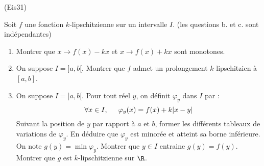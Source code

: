 \begin{tiny}(Eis31)\end{tiny} Soit $f$ une fonction $k$-lipschitzienne sur un intervalle $I$. (les questions b. et c. sont indépendantes)
\begin{enumerate}
 \item Montrer que $x\rightarrow f(x)-kx$ et $x\rightarrow f(x)+kx$ sont monotones.
 \item On suppose  $I=]a,b[$. Montrer que $f$ admet un prolongement $k$-lipschitzien à $[a,b]$.
 \item On suppose  $I=]a,b[$. Pour tout réel $y$, on définit $\varphi_y$ dans $I$ par :
\begin{displaymath}
 \forall x\in I, \hspace{0.5cm}
\varphi_y(x) = f(x) + k|x-y|
\end{displaymath}
Suivant la position de $y$ par rapport à $a$ et $b$, former les différents tableaux de variations de $\varphi_y$. En déduire que $\varphi_y$ est minorée et atteint sa borne inférieure. On note $g(y)=\min \varphi_y$.\newline
Montrer que $y\in I$ entraine $g(y)=f(y)$. Montrer que $g$ est $k$-lipschitzienne sur $\R$.
\end{enumerate}

